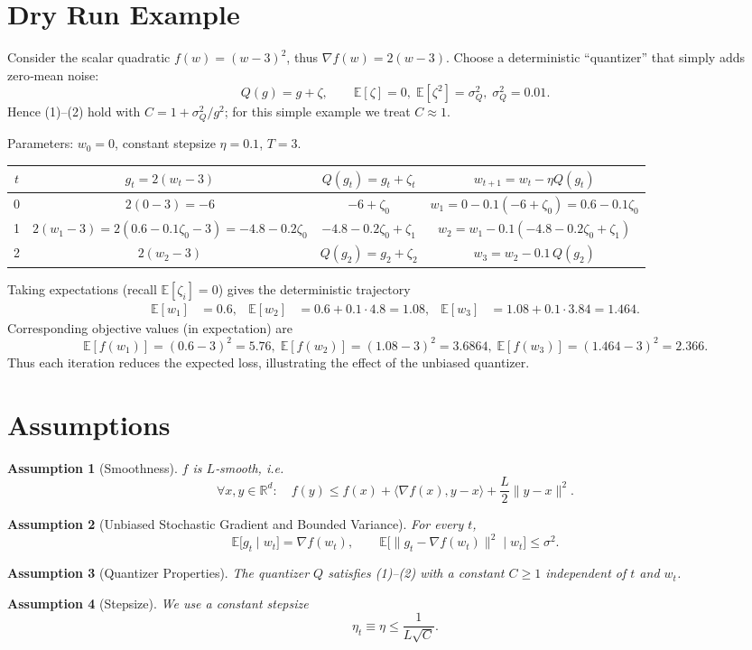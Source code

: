 \documentclass{article}
\newtheorem{assumption}{Assumption}
\newcommand{\E}{\mathbb{E}}
\newcommand{\R}{\mathbb{R}}
\begin{document}
\section*{Dry Run Example}
Consider the scalar quadratic $f(w)=(w-3)^2$, thus $\nabla f(w)=2(w-3)$.  
Choose a deterministic ``quantizer'' that simply adds zero‑mean noise:
\[
Q(g)=g+\zeta,\qquad \E[\zeta]=0,\;\E[\zeta^2]=\sigma_Q^2,\;\sigma_Q^2=0.01 .
\]
Hence (1)–(2) hold with $C=1+\sigma_Q^2/ g^2$; for this simple example we treat $C\approx1$.

Parameters: $w_0=0$, constant stepsize $\eta=0.1$, $T=3$.

\begin{center}
\begin{tabular}{c|c|c|c}
$t$ & $g_t=2(w_t-3)$ & $Q(g_t)=g_t+\zeta_t$ & $w_{t+1}=w_t-\eta Q(g_t)$ \\ \hline
0 & $2(0-3)=-6$ & $-6+ \zeta_0$ & $w_1=0-0.1(-6+\zeta_0)=0.6-0.1\zeta_0$ \\
1 & $2(w_1-3)=2(0.6-0.1\zeta_0-3)=-4.8-0.2\zeta_0$ &
$-4.8-0.2\zeta_0+\zeta_1$ &
$w_2=w_1-0.1(-4.8-0.2\zeta_0+\zeta_1)$ \\
2 & $\displaystyle 2(w_2-3)$ &
$Q(g_2)=g_2+\zeta_2$ &
$w_3=w_2-0.1\,Q(g_2)$
\end{tabular}
\end{center}
Taking expectations (recall $\E[\zeta_i]=0$) gives the deterministic trajectory
\[
\begin{aligned}
\E[w_1] &= 0.6, &
\E[w_2] &= 0.6 +0.1\cdot4.8 = 1.08, &
\E[w_3] &= 1.08 +0.1\cdot3.84 = 1.464 .
\end{aligned}
\]
Corresponding objective values (in expectation) are
\[
\E[f(w_1)]= (0.6-3)^2 =5.76,\;
\E[f(w_2)]=(1.08-3)^2=3.6864,\;
\E[f(w_3)]=(1.464-3)^2=2.366.
\]
Thus each iteration reduces the expected loss, illustrating the effect of the unbiased quantizer.

\section*{Assumptions}
\begin{assumption}[Smoothness]
$f$ is $L$‑smooth, i.e.
\[
\forall x,y\in\R^{d}:\quad
f(y)\le f(x)+\langle\nabla f(x),y-x\rangle+\frac{L}{2}\|y-x\|^{2}. \tag{A1}
\]
\end{assumption}
\begin{assumption}[Unbiased Stochastic Gradient and Bounded Variance]
For every $t$,
\[
\E\!\big[g_t\mid w_t\big]=\nabla f(w_t),\qquad
\E\!\big[\|g_t-\nabla f(w_t)\|^{2}\mid w_t\big]\le\sigma^{2}. \tag{A2}
\]
\end{assumption}
\begin{assumption}[Quantizer Properties]
The quantizer $Q$ satisfies (1)–(2) with a constant $C\ge1$ independent of $t$ and $w_t$.
\end{assumption}
\begin{assumption}[Stepsize]
We use a constant stepsize 
\[
\eta_t\equiv \eta\le\frac{1}{L\sqrt{C}}. \tag{A4}
\]
\end{assumption}
\end{document}
